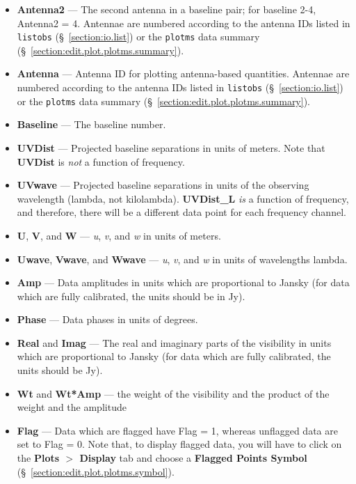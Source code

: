 \begin{itemize}
\item {\bf Antenna2} --- The second antenna in a baseline pair; for baseline 2-4, Antenna2 = 4. Antennae are numbered according to the antenna IDs listed in {\tt listobs} (\S~\ref{section:io.list}) or the {\tt plotms} data summary (\S~\ref{section:edit.plot.plotms.summary}).

\item {\bf Antenna} --- Antenna ID for plotting antenna-based quantities. Antennae are numbered according to the antenna IDs listed in {\tt listobs} (\S~\ref{section:io.list}) or the {\tt plotms} data summary (\S~\ref{section:edit.plot.plotms.summary}).

\item {\bf  Baseline} --- The baseline number.

\item {\bf UVDist} --- Projected baseline separations in units of meters. Note that {\bf UVDist} is {\it not} a function of frequency.

\item {\bf UVwave} --- Projected baseline separations in units of the observing wavelength (lambda, not kilolambda). {\bf UVDist\_L} {\it is} a function of frequency, and therefore, there will be a different data point for each frequency channel.

\item {\bf U}, {\bf V}, and {\bf W} --- {\it u}, {\it v}, and {\it w}
  in units of meters.

\item {\bf Uwave}, {\bf Vwave}, and {\bf Wwave} --- {\it u}, {\it v}, and {\it w}
  in units of wavelengths lambda.

\item {\bf Amp} --- Data amplitudes in units which are proportional to Jansky (for data which are fully calibrated, the units should be in Jy).

\item {\bf Phase} --- Data phases in units of degrees.

\item {\bf Real} and {\bf Imag} --- The real and imaginary parts of
  the visibility in units which are proportional to Jansky (for data
  which are fully calibrated, the units should be Jy).

\item {\bf Wt} and {\bf Wt*Amp} --- the weight of the visibility and
  the product of the weight and the amplitude


\item {\bf Flag} --- Data which are flagged have Flag = 1, whereas unflagged data are set to Flag = 0. Note that, to display flagged data, you will have to click on the {\bf Plots $>$ Display} tab and choose a {\bf Flagged Points Symbol} (\S~\ref{section:edit.plot.plotms.symbol}).


\end{itemize}
